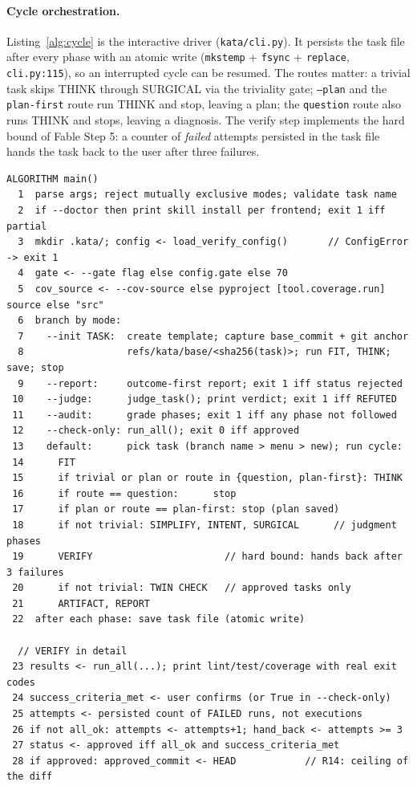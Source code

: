 \documentclass{sbc2019}%
\begin{document}
\paragraph{Cycle orchestration.} Listing~\ref{alg:cycle} is the interactive
driver (\texttt{kata/cli.py}). It persists the task file after every phase
with an atomic write (\texttt{mkstemp} + \texttt{fsync} + \texttt{replace},
\texttt{cli.py:115}), so an interrupted cycle can be resumed. The routes
matter: a trivial task skips THINK through SURGICAL via the triviality
gate; \texttt{--plan} and the \texttt{plan-first} route run THINK and
stop, leaving a plan; the \texttt{question} route also runs THINK and
stops, leaving a diagnosis. The verify step implements
the hard bound of Fable Step 5: a counter of \emph{failed} attempts
persisted in the task file hands the task back to the user after three
failures.

\begin{lstlisting}[caption=cycle orchestration (kata/cli.py).,label=alg:cycle]
ALGORITHM main()
  1  parse args; reject mutually exclusive modes; validate task name
  2  if --doctor then print skill install per frontend; exit 1 iff partial
  3  mkdir .kata/; config <- load_verify_config()       // ConfigError -> exit 1
  4  gate <- --gate flag else config.gate else 70
  5  cov_source <- --cov-source else pyproject [tool.coverage.run] source else "src"
  6  branch by mode:
  7    --init TASK:  create template; capture base_commit + git anchor
  8                  refs/kata/base/<sha256(task)>; run FIT, THINK; save; stop
  9    --report:     outcome-first report; exit 1 iff status rejected
 10    --judge:      judge_task(); print verdict; exit 1 iff REFUTED
 11    --audit:      grade phases; exit 1 iff any phase not followed
 12    --check-only: run_all(); exit 0 iff approved
 13    default:      pick task (branch name > menu > new); run cycle:
 14      FIT
 15      if trivial or plan or route in {question, plan-first}: THINK
 16      if route == question:      stop
 17      if plan or route == plan-first: stop (plan saved)
 18      if not trivial: SIMPLIFY, INTENT, SURGICAL      // judgment phases
 19      VERIFY                       // hard bound: hands back after 3 failures
 20      if not trivial: TWIN CHECK   // approved tasks only
 21      ARTIFACT, REPORT
 22  after each phase: save task file (atomic write)

  // VERIFY in detail
 23 results <- run_all(...); print lint/test/coverage with real exit codes
 24 success_criteria_met <- user confirms (or True in --check-only)
 25 attempts <- persisted count of FAILED runs, not executions
 26 if not all_ok: attempts <- attempts+1; hand_back <- attempts >= 3
 27 status <- approved iff all_ok and success_criteria_met
 28 if approved: approved_commit <- HEAD            // R14: ceiling of the diff
\end{lstlisting}
\end{document}
